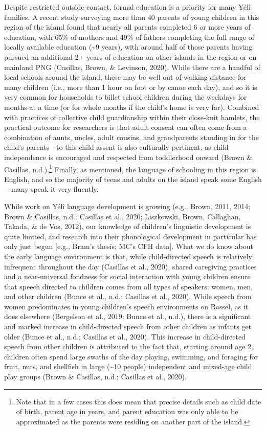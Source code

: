 \documentclass[english,,man,floatsintext]{apa6}
\begin{document}
Despite restricted outside contact, formal education is a priority for many Yélî families. A recent study surveying more than 40 parents of young children in this region of the island found that nearly all parents completed 6 or more years of education, with 65\% of mothers and 49\% of fathers completing the full range of locally available education (\textasciitilde{}9 years), with around half of those parents having pursued an additional 2+ years of education on other islands in the region or on mainland PNG (Casillas, Brown, \& Levinson, 2020). While there are a handful of local schools around the island, these may be well out of walking distance for many children (i.e., more than 1 hour on foot or by canoe each day), and so it is very common for households to billet school children during the weekdays for months at a time (or for whole months if the child's home is very far). Combined with practices of collective child guardianship within their close-knit hamlets, the practical outcome for researchers is that adult consent can often come from a combination of aunts, uncles, adult cousins, and grandparents standing in for the child's parents---to this child assent is also culturally pertinent, as child independence is encouraged and respected from toddlerhood onward (Brown \& Casillas, n.d.).\footnote{Note that in a few cases this does mean that precise details such as child date of birth, parent age in years, and parent education was only able to be approximated as the parents were residing on another part of the island.} Finally, as mentioned, the language of schooling in this region is English, and so the majority of teens and adults on the island speak some English---many speak it very fluently.

While work on Yélî language development is growing (e.g., Brown, 2011, 2014; Brown \& Casillas, n.d.; Casillas et al., 2020; Liszkowski, Brown, Callaghan, Takada, \& de Vos, 2012), our knowledge of children's linguistic development is quite limited, and research into their phonological development in particular has only just begun {[}e.g., Bram's thesis; MC's CFH data{]}. What we do know about the early language environment is that, while child-directed speech is relatively infrequent throughout the day (Casillas et al., 2020), shared caregiving practices and a near-universal fondness for social interaction with young children ensure that speech directed to children comes from all types of speakers: women, men, and other children (Bunce et al., n.d.; Casillas et al., 2020). While speech from women predominates in young children's speech environments on Rossel, as it does elsewhere (Bergelson et al., 2019; Bunce et al., n.d.), there is a significant and marked increase in child-directed speech from other children as infants get older (Bunce et al., n.d.; Casillas et al., 2020). This increase in child-directed speech from other children is attributed to the fact that, starting around age 2, children often spend large swaths of the day playing, swimming, and foraging for fruit, nuts, and shellfish in large (\textasciitilde{}10 people) independent and mixed-age child play groups (Brown \& Casillas, n.d.; Casillas et al., 2020).
\end{document}
